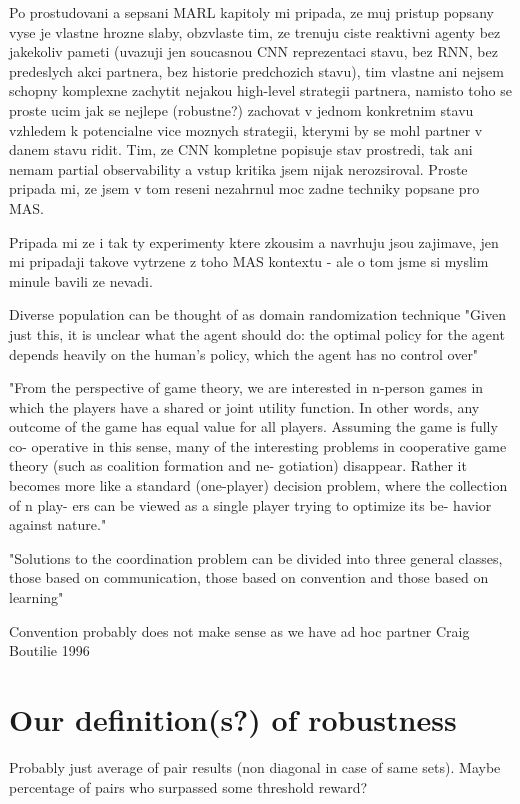 {\color{blue} Po prostudovani a sepsani MARL kapitoly mi pripada, ze muj pristup popsany vyse je vlastne hrozne slaby, obzvlaste tim, ze trenuju ciste reaktivni agenty bez jakekoliv pameti (uvazuji jen soucasnou CNN reprezentaci stavu, bez RNN, bez predeslych akci partnera, bez historie predchozich stavu),
tim vlastne ani nejsem schopny komplexne zachytit nejakou high-level strategii partnera, namisto toho se proste ucim jak se nejlepe (robustne?) zachovat v jednom konkretnim stavu vzhledem k potencialne vice moznych strategii, kterymi by se mohl partner v danem stavu ridit.
Tim, ze CNN kompletne popisuje stav prostredi, tak ani nemam partial observability a vstup kritika jsem nijak nerozsiroval.
Proste pripada mi, ze jsem v tom reseni nezahrnul moc zadne techniky popsane pro MAS.

Pripada mi ze i tak ty experimenty ktere zkousim a navrhuju jsou zajimave, jen mi pripadaji takove vytrzene z toho MAS kontextu - ale o tom jsme si myslim minule bavili ze nevadi.
}


Diverse population can be thought of as domain randomization technique
"Given just this, it is unclear what the agent should do: the optimal
policy for the agent depends heavily on the human’s policy, which the agent has no control over"

"From the perspective of game theory, we are interested
in n-person games in which the players have a shared or joint
utility function. In other words, any outcome of the game has
equal value for all players. Assuming the game is fully co-
operative in this sense, many of the interesting problems in
cooperative game theory (such as coalition formation and ne-
gotiation) disappear. Rather it becomes more like a standard
(one-player) decision problem, where the collection of n play-
ers can be viewed as a single player trying to optimize its be-
havior against nature." 

"Solutions to the coordination problem can be divided into
three general classes, those based on communication, those
based on convention and those based on learning"

Convention probably does not make sense as we have ad hoc partner
Craig Boutilie 1996

\section{Our definition(s?) of robustness}
Probably just average of pair results (non diagonal in case of same sets).
Maybe percentage of pairs who surpassed some threshold reward?

